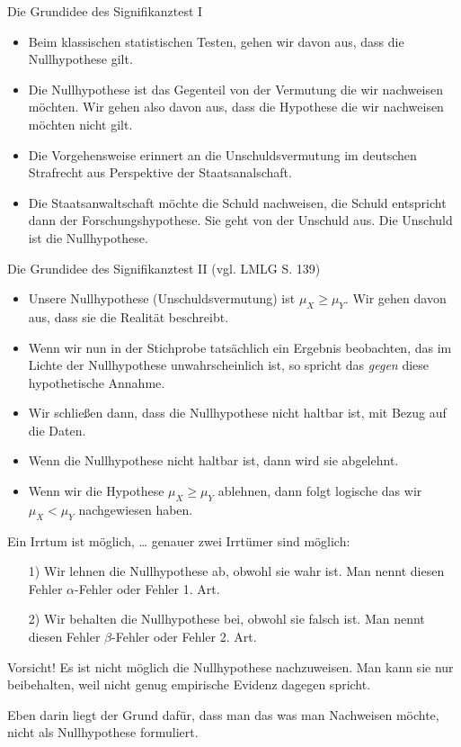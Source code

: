 \documentclass[usenames,dvipsnames,handout]{beamer}
\begin{document}
\begin{frame}{Die Grundidee des Signifikanztest I}
\begin{itemize}
\item{Beim klassischen statistischen Testen, gehen wir davon aus, dass die Nullhypothese gilt.}\pause
\item{Die Nullhypothese ist das Gegenteil von der Vermutung die wir nachweisen möchten. Wir gehen also davon aus,
dass die Hypothese die wir nachweisen möchten nicht gilt.}\pause
\item{Die Vorgehensweise erinnert an die Unschuldsvermutung im deutschen Strafrecht aus Perspektive der Staatsanalschaft.}\pause
\item{Die Staatsanwaltschaft möchte die Schuld nachweisen, die Schuld entspricht dann der Forschungshypothese.
Sie geht von der Unschuld aus. Die Unschuld ist die Nullhypothese.}
\end{itemize}
\end{frame}

\begin{frame}{Die Grundidee des Signifikanztest II (vgl. LMLG S. 139)}
\begin{itemize}
\item{Unsere Nullhypothese (Unschuldsvermutung) ist $\mu_{X} \geq \mu_{Y}.$ Wir gehen davon aus, dass sie die Realität
beschreibt.}\pause
\item{Wenn wir nun in der Stichprobe tatsächlich ein Ergebnis beobachten, das im Lichte der Nullhypothese unwahrscheinlich ist, so spricht
das \textit{gegen} diese hypothetische Annahme. }\pause
\item{Wir schließen dann, dass die Nullhypothese nicht haltbar ist, mit Bezug auf die Daten.}\pause
\item{Wenn die Nullhypothese nicht haltbar ist, dann wird sie abgelehnt. }
\item{Wenn wir die Hypothese $\mu_{X} \geq \mu_{Y}$ ablehnen, dann folgt logische das wir $\mu_{X} < \mu_{Y}$ nachgewiesen haben.}
\end{itemize}
\end{frame}


\begin{frame}{Ein Irrtum ist möglich, \dots}
genauer zwei Irrtümer sind möglich:
\begin{itemize}
\item[1)]{Wir lehnen die Nullhypothese ab, obwohl sie wahr ist. Man nennt diesen Fehler $\alpha$-Fehler oder Fehler 1. Art.}\pause
\item[2)]{Wir behalten die Nullhypothese bei, obwohl sie falsch ist. Man nennt diesen Fehler $\beta$-Fehler oder Fehler 2. Art.}
\end{itemize}
\begin{block}{Vorsicht!}
Es ist nicht möglich die Nullhypothese nachzuweisen. Man kann sie nur beibehalten, weil nicht genug empirische 
Evidenz dagegen spricht.
\end{block}\pause
Eben darin liegt der Grund dafür, dass man das was man Nachweisen möchte, nicht als Nullhypothese formuliert.
\end{frame}
\end{document}
